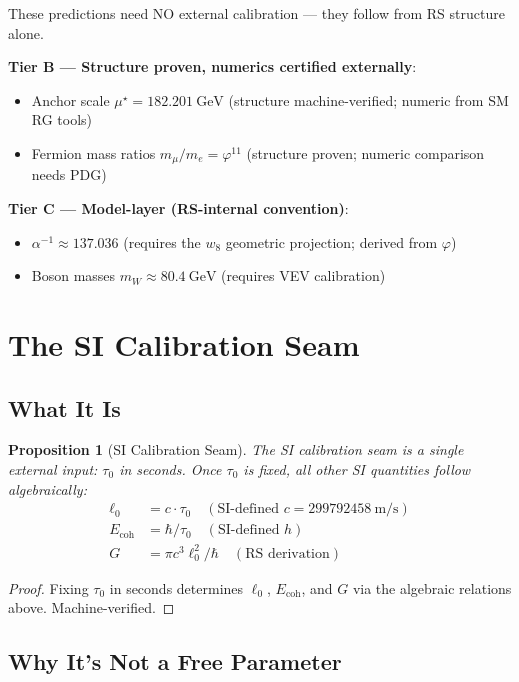 \documentclass[12pt,a4paper]{article}
\newtheorem{proposition}[theorem]{Proposition}
\theoremstyle{definition}
\theoremstyle{remark}
\begin{document}
These predictions need NO external calibration — they follow from RS structure alone.

\textbf{Tier B — Structure proven, numerics certified externally}:
\begin{itemize}
\item Anchor scale $\mu^\star = 182.201~\text{GeV}$ (structure machine-verified; numeric from SM RG tools)
\item Fermion mass ratios $m_\mu/m_e = \varphi^{11}$ (structure proven; numeric comparison needs PDG)
\end{itemize}

\textbf{Tier C — Model-layer (RS-internal convention)}:
\begin{itemize}
\item $\alpha^{-1} \approx 137.036$ (requires the $w_8$ geometric projection; derived from $\varphi$)
\item Boson masses $m_W \approx 80.4~\text{GeV}$ (requires VEV calibration)
\end{itemize}

\section{The SI Calibration Seam}

\subsection{What It Is}

\begin{proposition}[SI Calibration Seam]
The SI calibration seam is a single external input: $\tau_0$ in seconds.
Once $\tau_0$ is fixed, all other SI quantities follow algebraically:
\begin{align}
\ell_0 &= c \cdot \tau_0 \quad (\text{SI-defined } c = 299792458~\text{m/s})\\
E_\mathrm{coh} &= \hbar / \tau_0 \quad (\text{SI-defined } h)\\
G &= \pi c^3 \ell_0^2 / \hbar \quad (\text{RS derivation})
\end{align}
\end{proposition}

\begin{proof}
Fixing $\tau_0$ in seconds determines $\ell_0$, $E_\mathrm{coh}$, and $G$ 
via the algebraic relations above. Machine-verified.
\end{proof}

\subsection{Why It's Not a Free Parameter}
\end{document}
